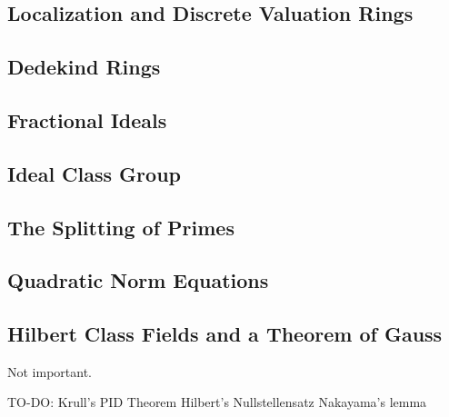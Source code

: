 \subsection{Localization and Discrete Valuation Rings}

\subsection{Dedekind Rings}

\subsection{Fractional Ideals}

\subsection{Ideal Class Group}

\subsection{The Splitting of Primes}

\subsection{Quadratic Norm Equations}

\subsection{Hilbert Class Fields and a Theorem of Gauss}
Not important.








TO-DO:
Krull's PID Theorem
Hilbert's Nullstellensatz
Nakayama's lemma